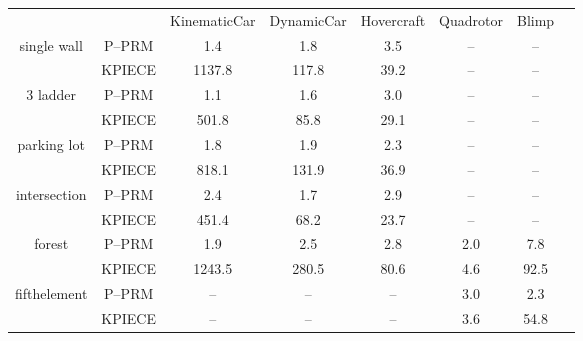 \documentclass{article}
\begin{document}
\begin{tabular}{c c c c c c c c}
&&KinematicCar&DynamicCar&Hovercraft&Quadrotor&Blimp\\
\multirow{2}{*}{single wall}&P--PRM&1.4&1.8&3.5&--&--\\
&KPIECE&1137.8&117.8&39.2&--&--\\
\multirow{2}{*}{3 ladder}&P--PRM&1.1&1.6&3.0&--&--\\
&KPIECE&501.8&85.8&29.1&--&--\\
\multirow{2}{*}{parking lot}&P--PRM&1.8&1.9&2.3&--&--\\
&KPIECE&818.1&131.9&36.9&--&--\\
\multirow{2}{*}{intersection}&P--PRM&2.4&1.7&2.9&--&--\\
&KPIECE&451.4&68.2&23.7&--&--\\
\multirow{2}{*}{forest}&P--PRM&1.9&2.5&2.8&2.0&7.8\\
&KPIECE&1243.5&280.5&80.6&4.6&92.5\\
\multirow{2}{*}{fifthelement}&P--PRM&--&--&--&3.0&2.3\\
&KPIECE&--&--&--&3.6&54.8\\
\end{tabular}
\end{document}
